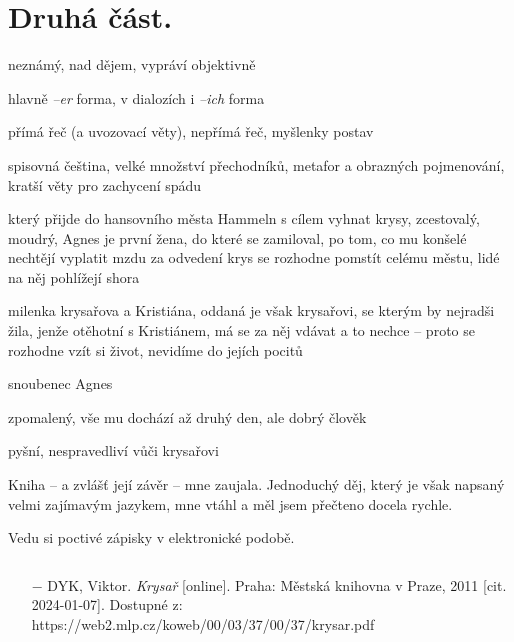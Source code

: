 \documentclass{article}
\begin{document}
\section{Druhá část.}
\begin{description}
    \setlength\itemsep{0.15em}
    \item[vypravěč:] neznámý, nad dějem, vypráví objektivně
    \item[vyprávěcí způsoby:] hlavně \textit{--er} forma, v dialozích i \textit{--ich} forma
    \item[typy promluv:] přímá řeč (a uvozovací věty), nepřímá řeč, myšlenky postav
    \item[jazyková stránka:] spisovná čeština, velké množství přechodníků, metafor a obrazných pojmenování, kratší věty pro zachycení spádu
    \item[postavy:]
        \begin{description}
            \setlength\itemsep{0.15em}
            \item[krysař,] který přijde do hansovního města Hammeln s cílem vyhnat krysy, zcestovalý, moudrý, Agnes je první žena, do které se zamiloval, po tom, co mu konšelé nechtějí vyplatit mzdu za odvedení krys se rozhodne pomstít celému městu, lidé na něj pohlížejí shora
            \item[Agnes,] milenka krysařova a Kristiána, oddaná je však krysařovi, se kterým by nejradši žila, jenže otěhotní s Kristiánem, má se za něj vdávat a to nechce -- proto se rozhodne vzít si život, nevidíme do jejích pocitů
            \item[Kristián,] snoubenec Agnes
            \item[Sepp Jörgen,] zpomalený, vše mu dochází až druhý den, ale dobrý člověk
            \item[konšelé,] pyšní, nespravedliví vůči krysařovi
        \end{description}
    \item[názor:] Kniha -- a zvlášť její závěr -- mne zaujala. Jednoduchý děj, který je však napsaný velmi zajímavým jazykem, mne vtáhl a měl jsem přečteno docela rychle.
    \item[kontext:] Vedu si poctivé zápisky v elektronické podobě.
    \item[zdroje:] $ $
    \begin{itemize}
        \setlength\itemsep{0em}
        \item[$-$] DYK, Viktor. \textit{Krysař}  [online]. Praha: Městská knihovna v Praze, 2011 [cit. 2024-01-07]. Dostupné z: https://web2.mlp.cz/koweb/00/03/37/00/37/krysar.pdf
    \end{itemize}
\end{description}
\end{document}
